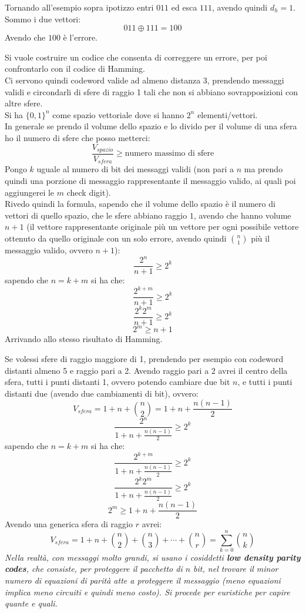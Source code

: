 \documentclass[a4paper,12pt, oneside]{book}
\begin{document}
\begin{esempio}
  Tornando all'esempio sopra ipotizzo entri $011$ ed esca $111$, avendo quindi
  $d_h=1$. \\
  Sommo i due vettori:
  \[011\oplus 111=100\]
  Avendo che $100$ è l'errore.
\end{esempio}
\begin{esempio}
  Si vuole costruire un codice che consenta di correggere un errore, per poi
  confrontarlo con il codice di Hamming.\\
  Ci servono quindi codeword valide ad almeno distanza 3, prendendo messaggi
  validi e circondarli di sfere di raggio 1 tali che non si abbiano
  sovrapposizioni con altre sfere.\\
  Si ha $\{0,1\}^n$ come spazio vettoriale dove si hanno $2^n$
  elementi/vettori. \\
  In generale se prendo il volume dello spazio e lo divido per il volume di una
  sfera ho il numero di sfere che posso metterci:
  \[\frac{V_{spazio}}{V_{sfera}}\geq \mbox{numero massimo di sfere}\]
  Pongo $k$ uguale al numero di bit dei messaggi validi (non pari a $n$ ma
  prendo quindi una porzione di messaggio rappresentante il messaggio valido, ai
  quali poi aggiungerei le $m$ check digit).\\
  Rivedo quindi la formula, sapendo che il volume dello spazio è il numero di
  vettori di quello spazio, che le sfere abbiano raggio $1$, avendo che hanno
  volume $n+1$ (il vettore rappresentante originale più un vettore per ogni
  possibile vettore ottenuto da quello originale con un solo errore, avendo
  quindi ${{n}\choose{1}}$ più il messaggio valido, ovvero $n+1$): 
  \[\frac{2^n}{n+1}\geq 2^k\]
  sapendo che $n=k+m$ si ha che:
  \[\frac{2^{k+m}}{n+1}\geq 2^k\]
  \[\frac{2^{k}2^m}{n+1}\geq 2^k\]
  \[2^m\geq n+1\]
  Arrivando allo stesso risultato di Hamming.
\end{esempio}
Se volessi sfere di raggio maggiore di 1, prendendo per esempio con codeword
distanti almeno 5 e raggio pari a 2. Avendo raggio pari a 2 avrei il centro
della sfera, tutti i punti distanti 1, ovvero potendo cambiare due bit $n$, e
tutti i punti distanti due (avendo due 
cambiamenti di bit), ovvero:
\[V_{sfera}=1+n+{{n}\choose{2}}=1+n+\frac{n(n-1)}{2}\]
\[\frac{2^n}{1+n+\frac{n(n-1)}{2}}\geq 2^k\]
sapendo che $n=k+m$ si ha che:
\[\frac{2^{k+m}}{1+n+\frac{n(n-1)}{2}}\geq 2^k\]
\[\frac{2^{k}2^m}{1+n+\frac{n(n-1)}{2}}\geq 2^k\]
\[2^m\geq 1+n+\frac{n(n-1)}{2}\]
Avendo una generica sfera di raggio $r$ avrei:
\[V_{sfera}=1+n+{{n}\choose{2}}+{{n}\choose{3}}+\cdots+{{n}\choose{r}}=
  \sum_{k=0}^n{{n}\choose{k}}\] 
\textit{Nella realtà, con messaggi molto grandi, si usano i cosiddetti
  \textbf{low density parity codes}, che consiste, per proteggere il pacchetto
  di $n$ bit, nel trovare il minor numero di equazioni di parità atte a
  proteggere il messaggio (meno equazioni implica meno circuiti e quindi meno
  costo). Si procede per euristiche per capire quante e quali.}
\end{document}
